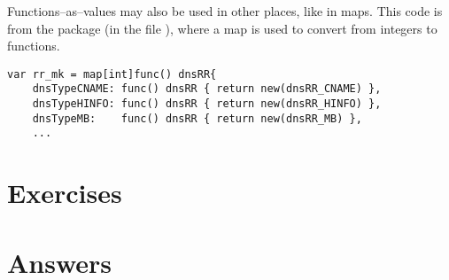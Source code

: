 Functions--as--values may also be used in other places, like in maps.
This code is from the package  (in the file
), where a map is used to convert
from integers to functions.
\begin{lstlisting}[caption=Function as values in maps]
var rr_mk = map[int]func() dnsRR{
    dnsTypeCNAME: func() dnsRR { return new(dnsRR_CNAME) },
    dnsTypeHINFO: func() dnsRR { return new(dnsRR_HINFO) },
    dnsTypeMB:    func() dnsRR { return new(dnsRR_MB) },
    ...
\end{lstlisting}


\section{Exercises}










\cleardoublepage
\section{Answers}
\shipoutAnswer
